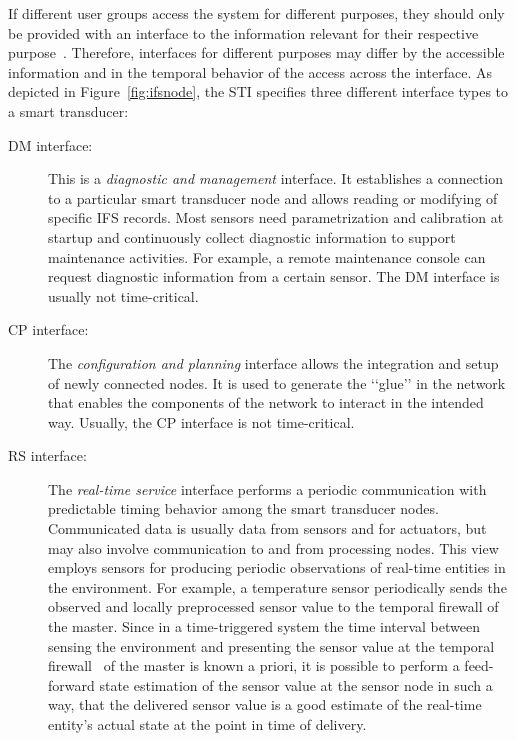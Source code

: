 \documentclass[11pt,a4paper,]{article}
\def\lqq{\lq\lq}
\def\rqq{\rq\rq}
\def\dq#1{\lqq #1\rqq}
\begin{document}
If different user groups access the system for different purposes,
they should only be provided with an interface to the information
relevant for their respective purpose~\cite{ran:97}. Therefore,
interfaces for different purposes may differ by the accessible
information and in the temporal behavior of the access across the
interface. As depicted in Figure~\ref{fig:ifsnode}, the STI
specifies three different interface types to a smart transducer:

\begin{description}

\item[DM interface:] This is a {\em diagnostic and management}
interface. It establishes a connection to a particular smart
transducer node and allows reading or modifying of specific \ac{IFS}
records. Most sensors need parametrization and calibration at
startup and continuously collect diagnostic information to support
maintenance activities. For example, a remote maintenance console
can request diagnostic information from a certain sensor. The DM
interface is usually not time-critical.

\item[CP interface:] The {\em configuration and planning}
interface allows the integration and setup of newly connected
nodes. It is used to generate the \dq{glue} in the network that
enables the components of the network to interact in the intended
way. Usually, the CP interface is not time-critical.

\item[RS interface:] The {\em real-time service} interface
performs a periodic communication with predictable timing behavior
among the smart transducer nodes. Communicated data is usually
data from sensors and for actuators, but may also involve
communication to and from processing nodes. This view employs
sensors for producing periodic observations of real-time entities
in the environment. For example, a temperature sensor periodically
sends the observed and locally preprocessed sensor value to the
temporal firewall of the master. Since in a time-triggered system
the time interval between sensing the environment and presenting
the sensor value at the temporal firewall~\cite{nossal:97} of the
master is known a priori, it is possible to perform a feed-forward
state estimation of the sensor value at the sensor node in such a
way, that the delivered sensor value is a good estimate of the
real-time entity's actual state at the point in time of delivery.

\end{description}
\end{document}
